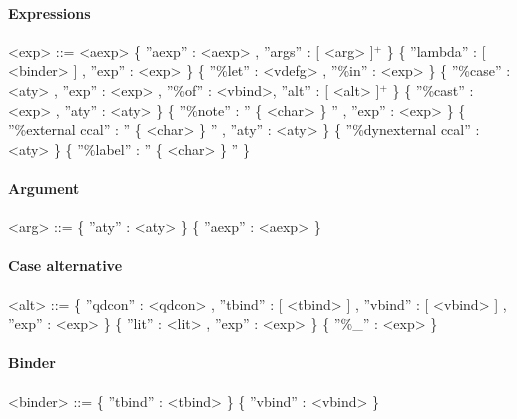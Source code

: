 \paragraph{Expressions}

\begin{grammar}

<exp>		  ::= 	 <aexp>
		  \alt 	 \{ ''aexp'' : <aexp> , ''args'' : [ <arg> ]$^{+}$ \} 				
		  \alt 	 \{ ''lambda'' : [ <binder> ] , ''exp'' : <exp> \}		
		  \alt 	 \{ ''\%let'' : <vdefg> , ''\%in'' : <exp> \}				
		  \alt 	 \{ ''\%case'' : <aty> , ''exp'' : <exp> , ''\%of'' : <vbind>, ''alt'' : [ <alt> ]$^{+}$ \}	
		  \alt 	 \{ ''\%cast'' : <exp> , ''aty'' : <aty>	\}		
		  \alt 	 \{ ''\%note'' : ''  \{ <char> \} '' , ''exp'' : <exp>	\}	
		  \alt 	 \{ ''\%external ccal'' : '' \{ <char> \} '' , ''aty'' : <aty> \}	
		  \alt 	 \{ ''\%dynexternal ccal'' : <aty> \}
		  \alt 	 \{ ''\%label'' : '' \{ <char> \} '' \}


\end{grammar}

\paragraph{Argument}

\begin{grammar}

<arg>		  ::= 	 \{ ''aty'' : <aty> \}											 
		  \alt 	 \{ ''aexp'' : <aexp> \}										


\end{grammar}

\paragraph{Case alternative}
\begin{grammar}

<alt>		  ::= 	 \{ ''qdcon'' : <qdcon> , ''tbind'' : [ <tbind> ] , ''vbind'' : [ <vbind> ] , ''exp'' : <exp> \}
		  \alt 			 \{ ''lit'' : <lit> , ''exp'' : <exp> \}
		  \alt 			 \{ ''\%\_'' : <exp> \}	


\end{grammar}

\paragraph{Binder}

\begin{grammar}

<binder>	  ::= 	\{ ''tbind'' : <tbind> \}		
		  \alt 	\{ ''vbind'' : <vbind> \}	


\end{grammar}

